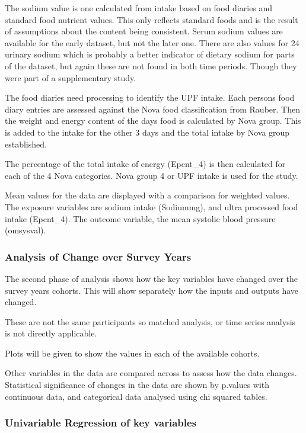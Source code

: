 \documentclass[
]{article}
\begin{document}
The sodium value is one calculated from intake based on food diaries and
standard food nutrient values. This only reflects standard foods and is
the result of assumptions about the content being consistent. Serum
sodium values are available for the early dataset, but not the later
one. There are also values for 24 urinary sodium which is probably a
better indicator of dietary sodium for parts of the dataset, but again
these are not found in both time periods. Though they were part of a
supplementary study.

The food diaries need processing to identify the UPF intake. Each
persons food diary entries are assessed against the Nova food
classification from Rauber. Then the weight and energy content of the
days food is calculated by Nova group. This is added to the intake for
the other 3 days and the total intake by Nova group established.

The percentage of the total intake of energy (Epcnt\_4) is then
calculated for each of the 4 Nova categories. Nova group 4 or UPF intake
is used for the study.

Mean values for the data are displayed with a comparison for weighted
values. The exposure variables are sodium intake (Sodiummg), and ultra
processed food intake (Epcnt\_4). The outcome variable, the mean
systolic blood pressure (omsysval).

\hypertarget{analysis-of-change-over-survey-years}{%
\subsubsection{Analysis of Change over Survey
Years}\label{analysis-of-change-over-survey-years}}

The second phase of analysis shows how the key variables have changed
over the survey years cohorts. This will show separately how the inputs
and outputs have changed.

These are not the same participants so matched analysis, or time series
analysis is not directly applicable.

Plots will be given to show the values in each of the available cohorts.

Other variables in the data are compared across to assess how the data
changes. Statistical significance of changes in the data are shown by
p.values with continuous data, and categorical data analysed using chi
squared tables.

\hypertarget{univariable-regression-of-key-variables}{%
\subsubsection{Univariable Regression of key
variables}\label{univariable-regression-of-key-variables}}
\end{document}

